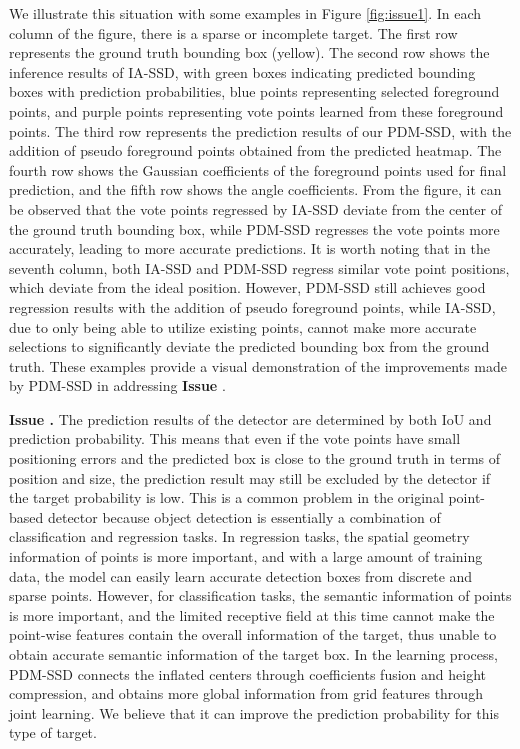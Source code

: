 We illustrate this situation with some examples in Figure \ref{fig:issue1}. In each column of the figure, there is a sparse or incomplete target. The first row represents the ground truth bounding box (yellow). The second row shows the inference results of IA-SSD, with green boxes indicating predicted bounding boxes with prediction probabilities, blue points representing selected foreground points, and purple points representing vote points learned from these foreground points. The third row represents the prediction results of our PDM-SSD, with the addition of pseudo foreground points obtained from the predicted heatmap. The fourth row shows the Gaussian coefficients of the foreground points used for final prediction, and the fifth row shows the angle coefficients. From the figure, it can be observed that the vote points regressed by IA-SSD deviate from the center of the ground truth bounding box, while PDM-SSD regresses the vote points more accurately, leading to more accurate predictions. It is worth noting that in the seventh column, both IA-SSD and PDM-SSD regress similar vote point positions, which deviate from the ideal position. However, PDM-SSD still achieves good regression results with the addition of pseudo foreground points, while IA-SSD, due to only being able to utilize existing points, cannot make more accurate selections to significantly deviate the predicted bounding box from the ground truth. These examples provide a visual demonstration of the improvements made by PDM-SSD in addressing \textbf{Issue \uppercase\expandafter{}}.

\textbf{Issue \uppercase\expandafter{}.} The prediction results of the detector are determined by both IoU and prediction probability. This means that even if the vote points have small positioning errors and the predicted box is close to the ground truth in terms of position and size, the prediction result may still be excluded by the detector if the target probability is low. This is a common problem in the original point-based detector because object detection is essentially a combination of classification and regression tasks. In regression tasks, the spatial geometry information of points is more important, and with a large amount of training data, the model can easily learn accurate detection boxes from discrete and sparse points. However, for classification tasks, the semantic information of points is more important, and the limited receptive field at this time cannot make the point-wise features contain the overall information of the target, thus unable to obtain accurate semantic information of the target box. In the learning process, PDM-SSD connects the inflated centers through coefficients fusion and height compression, and obtains more global information from grid features through joint learning. We believe that it can improve the prediction probability for this type of target.

